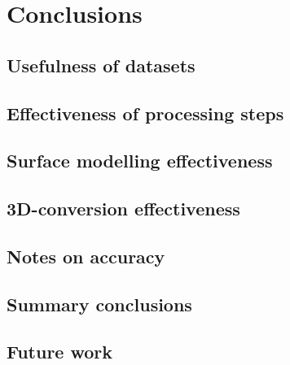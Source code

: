 
\chapter{Conclusions}
\label{chap:c}

\section{Usefulness of datasets}
\label{sec:usefulness}

\section{Effectiveness of processing steps}
\label{sec:effectivenessprocessing}

\section{Surface modelling effectiveness}
\label{sec:effectivenessmodelling}

\section{3D-conversion effectiveness}
\label{sec:effectivenessconversion}

\section{Notes on accuracy}
\label{sec:notesaccuracy}

\section{Summary conclusions}
\label{sec:conclusions}

\section{Future work}
\label{sec:futurework}